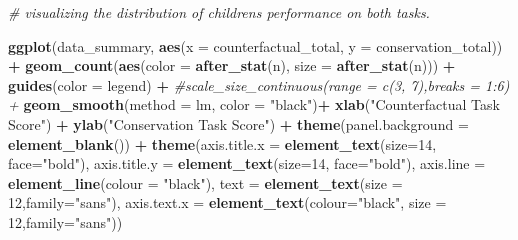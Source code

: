 \documentclass[
  doc]{apa6}
\newenvironment{Shaded}{\begin{snugshade}}{\end{snugshade}}
\newcommand{\AttributeTok}[1]{\textcolor[rgb]{0.13,0.29,0.53}{#1}}
\newcommand{\CommentTok}[1]{\textcolor[rgb]{0.56,0.35,0.01}{\textit{#1}}}
\newcommand{\DecValTok}[1]{\textcolor[rgb]{0.00,0.00,0.81}{#1}}
\newcommand{\FunctionTok}[1]{\textcolor[rgb]{0.13,0.29,0.53}{\textbf{#1}}}
\newcommand{\NormalTok}[1]{#1}
\newcommand{\SpecialCharTok}[1]{\textcolor[rgb]{0.81,0.36,0.00}{\textbf{#1}}}
\newcommand{\StringTok}[1]{\textcolor[rgb]{0.31,0.60,0.02}{#1}}
\begin{document}
\begin{Shaded}
\begin{Highlighting}[]
\CommentTok{\# visualizing the distribution of children\textquotesingle{}s performance on both tasks. }

\FunctionTok{ggplot}\NormalTok{(data\_summary, }\FunctionTok{aes}\NormalTok{(}\AttributeTok{x =}\NormalTok{ counterfactual\_total, }\AttributeTok{y =}\NormalTok{ conservation\_total)) }\SpecialCharTok{+}
  \FunctionTok{geom\_count}\NormalTok{(}\FunctionTok{aes}\NormalTok{(}\AttributeTok{color =} \FunctionTok{after\_stat}\NormalTok{(n), }\AttributeTok{size =} \FunctionTok{after\_stat}\NormalTok{(n))) }\SpecialCharTok{+}
  \FunctionTok{guides}\NormalTok{(}\AttributeTok{color =} \StringTok{\textquotesingle{}legend\textquotesingle{}}\NormalTok{) }\SpecialCharTok{+}
  \CommentTok{\#scale\_size\_continuous(range = c(3, 7),breaks = 1:6) +}
  \FunctionTok{geom\_smooth}\NormalTok{(}\AttributeTok{method =}\NormalTok{ lm, }\AttributeTok{color =} \StringTok{"black"}\NormalTok{)}\SpecialCharTok{+}
  \FunctionTok{xlab}\NormalTok{(}\StringTok{"Counterfactual Task Score"}\NormalTok{) }\SpecialCharTok{+}
  \FunctionTok{ylab}\NormalTok{(}\StringTok{"Conservation Task Score"}\NormalTok{) }\SpecialCharTok{+}
  \FunctionTok{theme}\NormalTok{(}\AttributeTok{panel.background =} \FunctionTok{element\_blank}\NormalTok{()) }\SpecialCharTok{+} 
  \FunctionTok{theme}\NormalTok{(}\AttributeTok{axis.title.x =} \FunctionTok{element\_text}\NormalTok{(}\AttributeTok{size=}\DecValTok{14}\NormalTok{, }\AttributeTok{face=}\StringTok{"bold"}\NormalTok{),}
        \AttributeTok{axis.title.y =} \FunctionTok{element\_text}\NormalTok{(}\AttributeTok{size=}\DecValTok{14}\NormalTok{, }\AttributeTok{face=}\StringTok{"bold"}\NormalTok{),}
        \AttributeTok{axis.line =} \FunctionTok{element\_line}\NormalTok{(}\AttributeTok{colour =} \StringTok{"black"}\NormalTok{),}
        \AttributeTok{text =} \FunctionTok{element\_text}\NormalTok{(}\AttributeTok{size =} \DecValTok{12}\NormalTok{,}\AttributeTok{family=}\StringTok{"sans"}\NormalTok{), }
        \AttributeTok{axis.text.x =} \FunctionTok{element\_text}\NormalTok{(}\AttributeTok{colour=}\StringTok{"black"}\NormalTok{, }\AttributeTok{size =} \DecValTok{12}\NormalTok{,}\AttributeTok{family=}\StringTok{"sans"}\NormalTok{))}
\end{Highlighting}
\end{Shaded}
\end{document}
